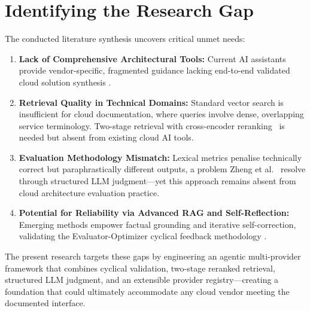 \section{Identifying the Research Gap}

The conducted literature synthesis uncovers critical unmet needs:

\begin{enumerate}
    \item \textbf{Lack of Comprehensive Architectural Tools:} Current AI assistants provide vendor-specific, fragmented guidance lacking end-to-end validated cloud solution synthesis \cite{aws2023q, microsoft2024copilot}.
    \item \textbf{Retrieval Quality in Technical Domains:} Standard vector search is insufficient for cloud documentation, where queries involve dense, overlapping service terminology. Two-stage retrieval with cross-encoder reranking~\cite{gao2023retrieval} is needed but absent from existing cloud AI tools.
    \item \textbf{Evaluation Methodology Mismatch:} Lexical metrics penalise technically correct but paraphrastically different outputs, a problem Zheng et al.~\cite{zheng2024judging} resolve through structured LLM judgment---yet this approach remains absent from cloud architecture evaluation practice.
    \item \textbf{Potential for Reliability via Advanced RAG and Self-Reflection:} Emerging methods \cite{lewis2020rag, asai2023selfrag} empower factual grounding and iterative self-correction, validating the Evaluator-Optimizer cyclical feedback methodology \cite{anthropic2024agents}.
\end{enumerate}

The present research targets these gaps by engineering an agentic multi-provider framework that combines cyclical validation, two-stage reranked retrieval, structured LLM judgment, and an extensible provider registry---creating a foundation that could ultimately accommodate any cloud vendor meeting the documented interface.